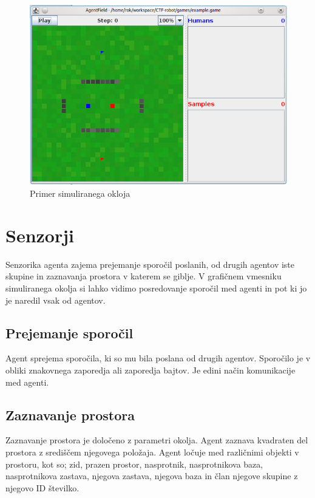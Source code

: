 \documentclass[12pt,a4paper,openany]{book}
\begin{document}
\begin{figure}[ht]
 \centering
 \includegraphics[width=13cm]{./pictures/Simulacisko.png}
 \caption[Simulirano okolje]{Primer simuliranega okloja}
 \label{okolje}
\end{figure}

\section{Senzorji}
Senzorika agenta zajema prejemanje sporočil poslanih, od drugih agentov iste skupine in zaznavanja
prostora v katerem se giblje. V grafičnem vmesniku simuliranega okolja si lahko vidimo posredovanje
sporočil med agenti in pot ki jo je naredil vsak od agentov. 

\subsection{Prejemanje sporočil}
Agent sprejema sporočila, ki so mu bila poslana od drugih agentov. Sporočilo je v obliki znakovnega
zaporedja ali zaporedja bajtov. Je edini način komunikacije med agenti.

\subsection{Zaznavanje prostora}
Zaznavanje prostora je določeno z parametri okolja.  Agent zaznava kvadraten del prostora z središčem
njegovega položaja. Agent ločuje med različnimi objekti v prostoru, kot so; zid, prazen prostor, nasprotnik, nasprotnikova baza,
nasprotnikova zastava, njegova zastava, njegova baza in član njegove skupine z njegovo ID številko.
\end{document}
